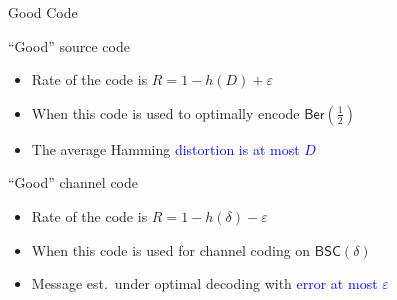\documentclass[10pt,presentation]{beamer}
\begin{document}
\begin{frame}{Good Code}
  \begin{block}{``Good'' source code}
    \begin{itemize}
    \item Rate of the code is $R=1-h(D)+\varepsilon$
    \item When this code is used to \alert{optimally encode} $\mathsf{Ber}(\tfrac{1}{2})$
    \item The average Hamming \textcolor{blue}{distortion is at most $D$}
    \end{itemize}
  \end{block}
  \vspace{0.4cm}
  \begin{block}{``Good'' channel code}
    \begin{itemize}
    \item Rate of the code is $R=1-h(\delta)-\varepsilon$
    \item When this code is used for channel coding on $\mathsf{BSC}(\delta)$
    \item Message est.~under \alert{optimal decoding} with \textcolor{blue}{error at most $\varepsilon$}
    \end{itemize}
  \end{block}
\end{frame}
\end{document}
